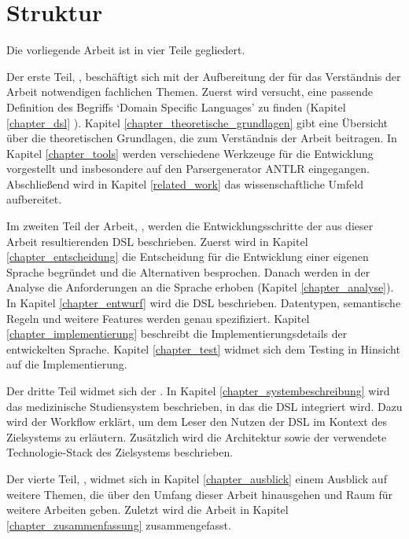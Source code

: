 \section{Struktur}

Die vorliegende Arbeit ist in vier Teile gegliedert.

Der erste Teil, \emph{}, beschäftigt sich mit der Aufbereitung der für das Verständnis der Arbeit notwendigen fachlichen Themen. Zuerst wird versucht, eine passende Definition des Begriffs `Domain Specific Languages' zu finden (Kapitel \ref{chapter_dsl} ). Kapitel \ref{chapter_theoretische_grundlagen} gibt eine Übersicht über die theoretischen Grundlagen, die zum Verständnis der Arbeit beitragen. In Kapitel \ref{chapter_tools} werden verschiedene Werkzeuge für die Entwicklung vor\-ge\-stel\-lt und insbesondere auf den Parsergenerator ANTLR eingegangen. Ab\-schlie\-ßend wird in Kapitel \ref{related_work} das wissenschaftliche Umfeld aufbereitet.

Im zweiten Teil der Arbeit, \emph{}, werden die Entwicklungsschritte der aus dieser Arbeit resultierenden DSL beschrieben. Zuerst wird in Kapitel \ref{chapter_entscheidung} die Entscheidung für die Entwicklung einer eigenen Sprache begründet und die Alternativen besprochen. Danach werden in der Analyse die Anforderungen an die Sprache erhoben (Kapitel \ref{chapter_analyse}). In Kapitel \ref{chapter_entwurf} wird die DSL beschrieben. Datentypen, semantische Regeln und weitere Features werden genau spezifiziert. Kapitel \ref{chapter_implementierung} beschreibt die Implementierungsdetails der entwickelten Sprache. Kapitel \ref{chapter_test} widmet sich dem Testing in Hinsicht auf die Implementierung.

Der dritte Teil widmet sich der \emph{}. In Kapitel \ref{chapter_systembeschreibung} wird das medizinische Studiensystem beschrieben, in das die DSL integriert wird. Dazu wird der Workflow erklärt, um dem Leser den Nutzen der DSL im Kontext des Zielsystems zu erläutern. Zusätzlich wird die Architektur sowie der verwendete Technologie-Stack des Zielsystems beschrieben.

Der vierte Teil, \emph{}, widmet sich in Kapitel \ref{chapter_ausblick} einem Ausblick auf weitere Themen, die über den Umfang dieser Arbeit hinausgehen und Raum für weitere Arbeiten geben. Zuletzt wird die Arbeit in Kapitel \ref{chapter_zusammenfassung} zusammengefasst.




